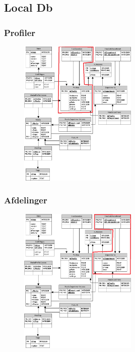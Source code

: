 \documentclass{beamer}
\begin{document}
\subsection{Local Db}

\begin{frame}
	\frametitle{Profiler}
	
	\begin{figure}[!h]
		\centering
			\includegraphics[width=0.5\textwidth]{dbProfiler}
		\label{fig:profiler}
	\end{figure}
\end{frame}

\begin{frame}
	\frametitle{Afdelinger}
	
	\begin{figure}[!h]
		\centering
			\includegraphics[width=0.5\textwidth]{dbAfdelinger}
		\label{fig:Afdelinger}
	\end{figure}
\end{frame}
\end{document}
